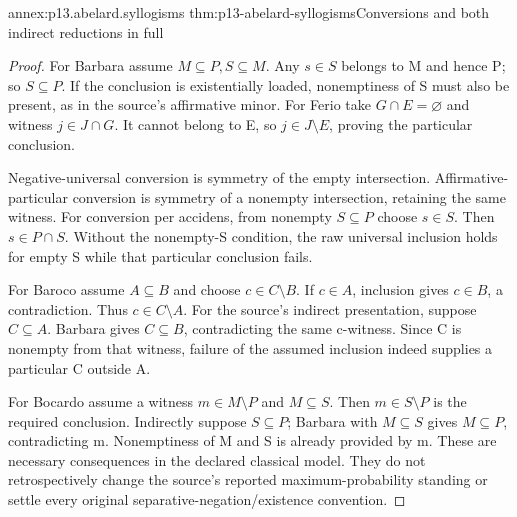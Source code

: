 \begin{annexitem}{annex:p13.abelard.syllogisms}
 {thm:p13-abelard-syllogisms}{Conversions and both indirect reductions in full}
\begin{proof}
For Barbara assume \(M\subseteq P,S\subseteq M\).
Any \(s\in S\) belongs to M and hence P; so \(S\subseteq P\).
If the conclusion is existentially loaded, nonemptiness of S
must also be present, as in the source's affirmative minor.
For Ferio take \(G\cap E=\varnothing\) and witness
\(j\in J\cap G\). It cannot belong to E, so
\(j\in J\setminus E\), proving the particular conclusion.

Negative-universal conversion is symmetry of the empty intersection.
Affirmative-particular conversion is symmetry of a nonempty
intersection, retaining the same witness.
For conversion per accidens, from nonempty \(S\subseteq P\)
choose \(s\in S\). Then \(s\in P\cap S\).
Without the nonempty-S condition, the raw universal inclusion
holds for empty S while that particular conclusion fails.

For Baroco assume \(A\subseteq B\) and choose
\(c\in C\setminus B\). If \(c\in A\), inclusion gives
\(c\in B\), a contradiction. Thus \(c\in C\setminus A\).
For the source's indirect presentation, suppose
\(C\subseteq A\). Barbara gives \(C\subseteq B\),
contradicting the same c-witness. Since C is nonempty
from that witness, failure of the assumed inclusion
indeed supplies a particular C outside A.

For Bocardo assume a witness \(m\in M\setminus P\)
and \(M\subseteq S\). Then \(m\in S\setminus P\)
is the required conclusion.
Indirectly suppose \(S\subseteq P\); Barbara with
\(M\subseteq S\) gives \(M\subseteq P\), contradicting m.
Nonemptiness of M and S is already provided by m.
These are necessary consequences in the declared classical
model. They do not retrospectively change the source's
reported maximum-probability standing or settle every
original separative-negation/existence convention.
\end{proof}
\end{annexitem}


